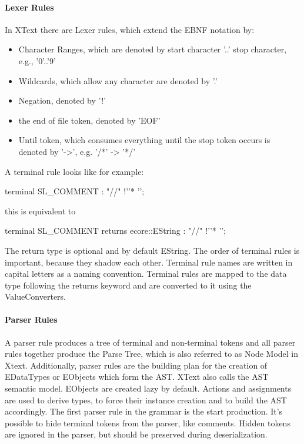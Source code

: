 \paragraph{Lexer Rules}
In XText there are Lexer rules, which extend the EBNF notation by:
\begin{itemize}
	\item Character Ranges, which are denoted by start character '..' stop character, e.g., '0'..'9' 
	\item Wildcards, which allow any character are denoted by '.'
	\item Negation, denoted by '!'
	\item the end of file token, denoted by 'EOF'
	\item Until token, which consumes everything until the stop token occurs is denoted by '->', e.g. '/*' -> '*/'
\end{itemize}
A terminal rule looks like for example:
\begin{xtxt}
terminal SL_COMMENT : "//" !'\n'* '\n';
\end{xtxt}
this is equivalent to 
\begin{xtxt}
terminal SL_COMMENT returns ecore::EString : "//" !'\n'* '\n';
\end{xtxt}
The return type is optional and by default EString. The order of terminal rules is important, because they shadow each other. Terminal rule names are written in capital letters as a naming convention. Terminal rules are mapped to the data type following the returns keyword and are converted to it using the ValueConverters.

\paragraph{Parser Rules}
A parser rule produces a tree of terminal and non-terminal tokens and all parser rules together produce the Parse Tree, which is also referred to as Node Model in Xtext. Additionally, parser rules are the building plan for the creation of EDataTypes or EObjects which form the AST. XText also calls the AST semantic model. EObjects are created lazy by default. Actions and assignments are used to derive types, to force their instance creation and to build the AST accordingly. The first parser rule in the grammar is the start production. It's possible to hide terminal tokens from the parser, like comments. Hidden tokens are ignored in the parser, but should be preserved during deserialization.

